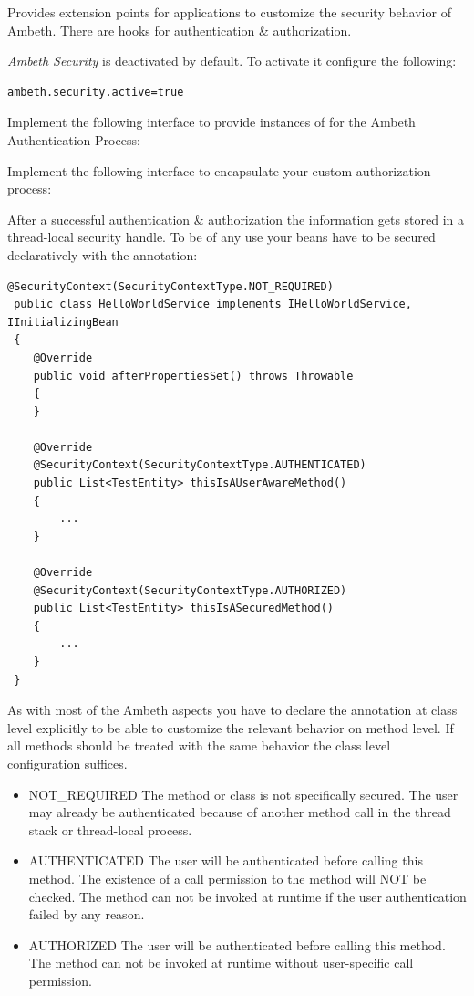 Provides extension points for applications to customize the security behavior of Ambeth. There are hooks for authentication \& authorization.

\textit{Ambeth Security} is deactivated by default. To activate it configure the following:
\begin{lstlisting}[style=Props]
ambeth.security.active=true
\end{lstlisting}

Implement the following interface to provide instances of  for the Ambeth Authentication Process:

Implement the following interface to encapsulate your custom authorization process:

After a successful authentication \& authorization the information gets stored in a thread-local security handle. To be of any use your beans have to be secured declaratively with the  annotation:

\begin{lstlisting}[style=Java]
@SecurityContext(SecurityContextType.NOT_REQUIRED)
 public class HelloWorldService implements IHelloWorldService, IInitializingBean
 {
 	@Override
 	public void afterPropertiesSet() throws Throwable
 	{
 	}
 
 	@Override
 	@SecurityContext(SecurityContextType.AUTHENTICATED)
 	public List<TestEntity> thisIsAUserAwareMethod()
 	{
 		...
 	}
 
 	@Override
 	@SecurityContext(SecurityContextType.AUTHORIZED)
 	public List<TestEntity> thisIsASecuredMethod()
 	{
 		...
 	}
 }
\end{lstlisting}
As with most of the Ambeth aspects you have to declare the annotation at class level explicitly to be able to customize the relevant behavior on method level. If all methods should be treated with the same behavior the class level configuration suffices.

\begin{itemize}
	\item NOT\_REQUIRED The method or class is not specifically secured. The user may already be authenticated because of another method call in the thread stack or thread-local process.
	\item AUTHENTICATED The user will be authenticated before calling this method. The existence of a call permission to the method will NOT be checked. The method can not be invoked at runtime if the user authentication failed by any reason.
	\item AUTHORIZED The user will be authenticated before calling this method. The method can not be invoked at runtime without user-specific call permission.
\end{itemize}

